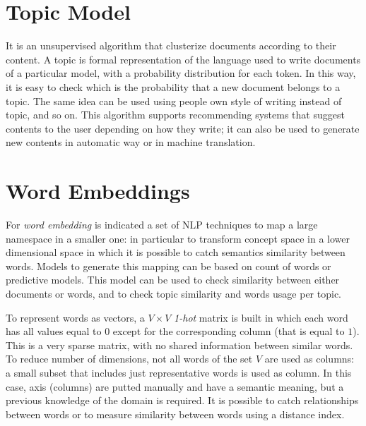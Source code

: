 \documentclass[11pt, a4page]{article}
\begin{document}
\section{Topic Model}
It is an unsupervised algorithm that clusterize documents according to their content.
A topic is formal representation of the language used to write documents of a particular model, with a probability distribution for each token.
In this way, it is easy to check which is the probability that a new document belongs to a topic.
The same idea can be used using people own style of writing instead of topic, and so on.
This algorithm supports recommending systems that suggest contents to the user depending on how they write; it can also be used to generate new contents in  automatic way or in machine translation.

\section{Word Embeddings}
For \textit{word embedding} is indicated a set of NLP techniques to map a large namespace in a smaller one: in particular to transform concept space in a lower dimensional space in which it is possible to catch semantics similarity between words.
Models to generate this mapping can be based on count of words or predictive models.
This model can be used to check similarity between either documents or words, and to check topic similarity and words usage per topic.

To represent words as vectors, a $V \times V$ \textit{1-hot} matrix is built in which each word has all values equal to $0$ except for the corresponding column (that is equal to $1$).
This is a very sparse matrix, with no shared information between similar words.
To reduce number of dimensions, not all words of the set $V$ are used as columns: a small subset that includes just representative words is used as column.
In this case, axis (columns) are putted manually and have a semantic meaning, but a previous knowledge of the domain is required.
It is possible to catch relationships between words or to measure similarity between words using a distance index.
\end{document}
